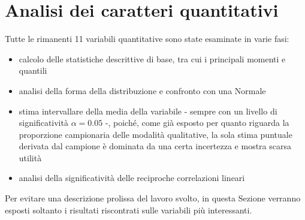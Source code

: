 \documentclass[fleqn,10pt]{SelfArx} %
\begin{document}
\section{Analisi dei caratteri quantitativi}\label{cquant}
Tutte le rimanenti 11 variabili quantitative sono state esaminate in varie fasi:
\begin{itemize}
    \item calcolo delle statistiche descrittive di base, tra cui i principali momenti e quantili
    \item analisi della forma della distribuzione e confronto con una Normale
    \item stima intervallare della media della variabile - sempre con un livello di significatività $\alpha=0.05$ -, poiché, come già esposto per quanto riguarda la proporzione campionaria delle modalità qualitative, la sola stima puntuale derivata dal campione è dominata da una certa incertezza e mostra scarsa utilità
    \item analisi della significatività delle reciproche correlazioni lineari
\end{itemize}
Per evitare una descrizione prolissa del lavoro svolto, in questa Sezione verranno esposti soltanto i risultati riscontrati sulle variabili più interessanti.
\end{document}
